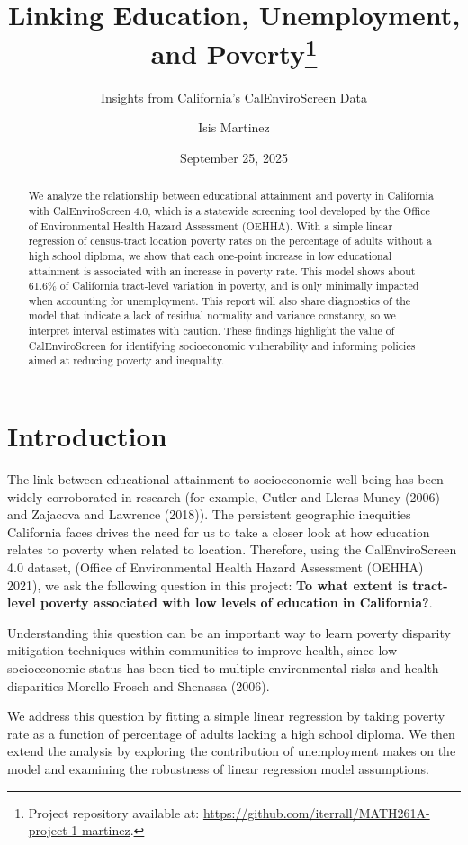 \documentclass[
  letterpaper,
  DIV=11,
  numbers=noendperiod]{scrartcl}
\title{Linking Education, Unemployment, and Poverty\thanks{Project
repository available at:
\url{https://github.com/iterrall/MATH261A-project-1-martinez}.}}
\subtitle{Insights from California's CalEnviroScreen Data}
\author{Isis Martinez}
\date{September 25, 2025}
\begin{document}
\maketitle
\begin{abstract}
We analyze the relationship between educational attainment and poverty
in California with CalEnviroScreen 4.0, which is a statewide screening
tool developed by the Office of Environmental Health Hazard Assessment
(OEHHA). With a simple linear regression of census-tract location
poverty rates on the percentage of adults without a high school diploma,
we show that each one-point increase in low educational attainment is
associated with an increase in poverty rate. This model shows about
61.6\% of California tract-level variation in poverty, and is only
minimally impacted when accounting for unemployment. This report will
also share diagnostics of the model that indicate a lack of residual
normality and variance constancy, so we interpret interval estimates
with caution. These findings highlight the value of CalEnviroScreen for
identifying socioeconomic vulnerability and informing policies aimed at
reducing poverty and inequality.
\end{abstract}


\section{Introduction}\label{sec-intro}

The link between educational attainment to socioeconomic well-being has
been widely corroborated in research (for example, Cutler and
Lleras-Muney (2006) and Zajacova and Lawrence (2018)). The persistent
geographic inequities California faces drives the need for us to take a
closer look at how education relates to poverty when related to
location. Therefore, using the CalEnviroScreen 4.0 dataset, (Office of
Environmental Health Hazard Assessment (OEHHA) 2021), we ask the
following question in this project: \textbf{To what extent is
tract-level poverty associated with low levels of education in
California?}.

Understanding this question can be an important way to learn poverty
disparity mitigation techniques within communities to improve health,
since low socioeconomic status has been tied to multiple environmental
risks and health disparities Morello-Frosch and Shenassa (2006).

We address this question by fitting a simple linear regression by taking
poverty rate as a function of percentage of adults lacking a high school
diploma. We then extend the analysis by exploring the contribution of
unemployment makes on the model and examining the robustness of linear
regression model assumptions.
\end{document}
